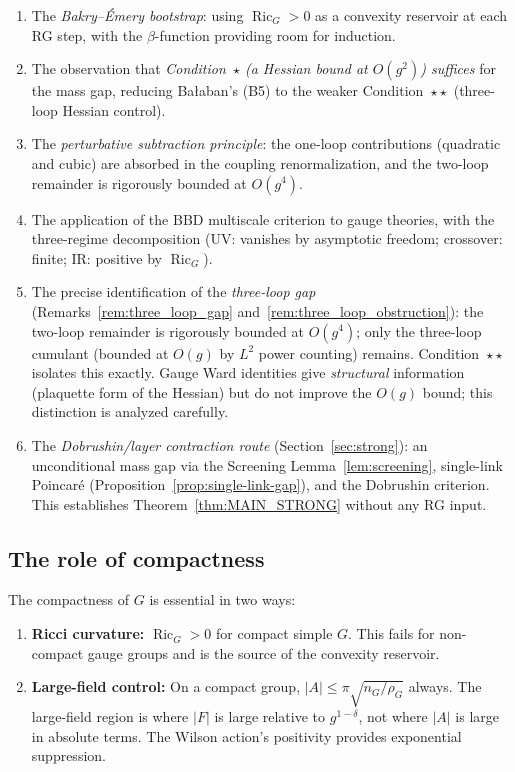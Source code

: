 \documentclass[11pt,a4paper]{article}
\theoremstyle{plain}
\theoremstyle{definition}
\theoremstyle{remark}
\newcommand{\Ric}{\operatorname{Ric}}
\begin{document}
\begin{enumerate}[nosep]
  \item The \emph{Bakry--\'Emery bootstrap}: using
    $\Ric_G > 0$ as a convexity reservoir at each RG step,
    with the $\beta$-function providing room for induction.
  \item The observation that \emph{Condition~$\star$
    (a Hessian bound at $O(g^2)$) suffices} for the
    mass gap, reducing Ba{\l}aban's (B5) to the weaker
    Condition~$\star\star$ (three-loop Hessian control).
  \item The \emph{perturbative subtraction principle}:
    the one-loop contributions (quadratic and cubic) are
    absorbed in the coupling renormalization, and the
    two-loop remainder is rigorously bounded at $O(g^4)$.
  \item The application of the BBD multiscale criterion
    to gauge theories, with the three-regime decomposition
    (UV: vanishes by asymptotic freedom; crossover: finite;
    IR: positive by $\Ric_G$).
  \item The precise identification of the \emph{three-loop
    gap} (Remarks~\ref{rem:three_loop_gap}
    and~\ref{rem:three_loop_obstruction}): the two-loop
    remainder is rigorously bounded at $O(g^4)$; only the
    three-loop cumulant (bounded at $O(g)$ by $L^2$ power
    counting) remains. Condition~$\star\star$ isolates this
    exactly. Gauge Ward identities give \emph{structural}
    information (plaquette form of the Hessian) but do not
    improve the $O(g)$ bound; this distinction is analyzed
    carefully.
  \item The \emph{Dobrushin/layer contraction route}
    (Section~\ref{sec:strong}): an unconditional mass gap
    via the Screening Lemma~\ref{lem:screening}, single-link
    Poincar\'e (Proposition~\ref{prop:single-link-gap}), and
    the Dobrushin criterion. This establishes
    Theorem~\ref{thm:MAIN_STRONG} without any RG input.
\end{enumerate}

\subsection{The role of compactness}

The compactness of $G$ is essential in two ways:
\begin{enumerate}[nosep]
  \item \textbf{Ricci curvature:} $\Ric_G > 0$ for
    compact simple $G$. This fails for non-compact gauge
    groups and is the source of the convexity reservoir.
  \item \textbf{Large-field control:} On a compact group,
    $|A| \le \pi\sqrt{n_G/\rho_G}$ always. The large-field
    region is where $|F|$ is large relative to $g^{1-\delta}$,
    not where $|A|$ is large in absolute terms. The Wilson
    action's positivity provides exponential suppression.
\end{enumerate}
\end{document}
